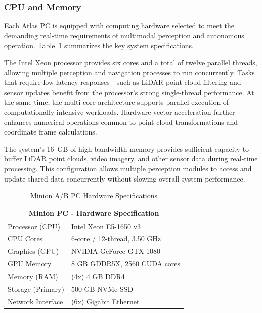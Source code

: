 \documentclass{erauthesis}
\begin{document}


\subsubsection{CPU and Memory}
Each Atlas PC is equipped with computing hardware selected to meet the demanding real-time requirements of multimodal perception and autonomous operation.  
Table~\ref{table:Minion_hardware} summarizes the key system specifications.

The Intel Xeon processor provides six cores and a total of twelve parallel threads, allowing multiple perception and navigation processes to run concurrently.  
Tasks that require low-latency responses—such as LiDAR point cloud filtering and sensor updates benefit from the processor’s strong single-thread performance.
At the same time, the multi-core architecture supports parallel execution of computationally intensive workloads.
Hardware vector acceleration further enhances numerical operations common to point cloud transformations and coordinate frame calculations.

The system’s 16~GB of high-bandwidth memory provides sufficient capacity to buffer LiDAR point clouds, video imagery, and other sensor data during real-time processing.  
This configuration allows multiple perception modules to access and update shared data concurrently without slowing overall system performance.

\begin{table}[htpb]
\centering
\caption{Minion A/B PC Hardware Specifications}
\begin{tabular}{ll}
\hline
\multicolumn{2}{c}{Minion PC - Hardware Specification} \\
\hline
\hline
Processor (CPU) & Intel Xeon E5-1650 v3 \\
CPU Cores & 6-core / 12-thread, 3.50 GHz \\
Graphics (GPU) & NVIDIA GeForce GTX 1080 \\
GPU Memory & 8 GB GDDR5X, 2560 CUDA cores \\
Memory (RAM) & (4x) 4 GB DDR4 \\
Storage (Primary) & 500 GB NVMe SSD \\
Network Interface & (6x) Gigabit Ethernet \\%
\hline
\end{tabular}
\label{table:Minion_hardware}
\end{table}
\end{document}
